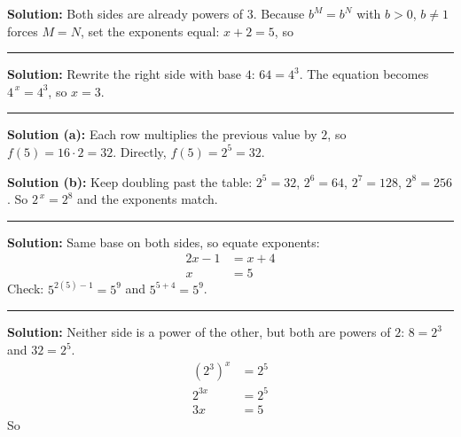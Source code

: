 \documentclass[12pt]{article}
\begin{document}



\textbf{Solution:} Both sides are already powers of $3$. Because $b^{M} = b^{N}$ with $b > 0$, $b \neq 1$ forces $M = N$, set the exponents equal: $x + 2 = 5$, so 

\vspace{0.15cm}\noindent\rule{\linewidth}{0.2pt}


\textbf{Solution:} Rewrite the right side with base $4$: $64 = 4^{3}$. The equation becomes $4^{\,x} = 4^{3}$, so $x = 3$. 

\vspace{0.15cm}\noindent\rule{\linewidth}{0.2pt}


\textbf{Solution (a):} Each row multiplies the previous value by $2$, so $f(5) = 16 \cdot 2 = 32$. Directly, $f(5) = 2^{5} = 32$. 

\textbf{Solution (b):} Keep doubling past the table: $2^{5} = 32$, $2^{6} = 64$, $2^{7} = 128$, $2^{8} = 256$. So $2^{\,x} = 2^{8}$ and the exponents match. 

\vspace{0.15cm}\noindent\rule{\linewidth}{0.2pt}


\textbf{Solution:} Same base on both sides, so equate exponents:
\begin{align*}
  2x - 1 &= x + 4 \\
  x &= 5
\end{align*}
Check: $5^{2(5)-1} = 5^{9}$ and $5^{5+4} = 5^{9}$. 

\vspace{0.15cm}\noindent\rule{\linewidth}{0.2pt}


\textbf{Solution:} Neither side is a power of the other, but both are powers of $2$: $8 = 2^{3}$ and $32 = 2^{5}$.
\begin{align*}
  \left(2^{3}\right)^{x} &= 2^{5} \\
  2^{3x} &= 2^{5} \\
  3x &= 5
\end{align*}
So 
\end{document}
